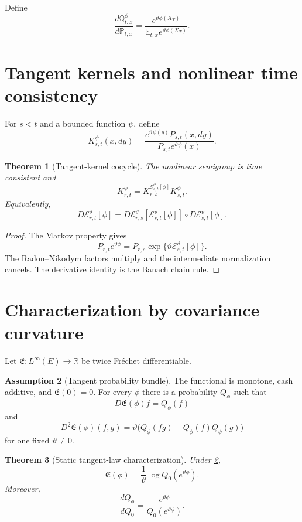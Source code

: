 \documentclass[11pt,reqno]{amsart}
\newtheorem{theorem}{Theorem}[section]
\theoremstyle{definition}
\newtheorem{assumption}[theorem]{Assumption}
\theoremstyle{remark}
\newcommand{\E}{\mathbb E}
\newcommand{\Pp}{\mathbb P}
\newcommand{\Qp}{\mathbb Q}
\newcommand{\R}{\mathbb R}
\newcommand{\cE}{\mathcal E}
\begin{document}
Define
\[
 \frac{d\Qp_{t,x}^{\phi}}{d\Pp_{t,x}}
 =
 \frac{e^{\vartheta\phi(X_T)}}
 {\E_{t,x}e^{\vartheta\phi(X_T)}}.
\]

\section{Tangent kernels and nonlinear time consistency}\label{sec:cocycle}

For $s<t$ and a bounded function $\psi$, define
\[
 K_{s,t}^{\psi}(x,dy)
 =
 \frac{e^{\vartheta\psi(y)}P_{s,t}(x,dy)}
 {P_{s,t}e^{\vartheta\psi}(x)}.
\]

\begin{theorem}[Tangent-kernel cocycle]\label{thm:cocycle}
The nonlinear semigroup is time consistent and
\[
 K_{r,t}^{\phi}
 =
 K_{r,s}^{\cE_{s,t}^{\vartheta}[\phi]}
 K_{s,t}^{\phi}.
\]
Equivalently,
\[
 D\cE_{r,t}^{\vartheta}[\phi]
 =
 D\cE_{r,s}^{\vartheta}
 [\cE_{s,t}^{\vartheta}[\phi]]
 \circ
 D\cE_{s,t}^{\vartheta}[\phi].
\]
\end{theorem}

\begin{proof}
The Markov property gives
\[
 P_{r,t}e^{\vartheta\phi}
 =
 P_{r,s}
 \exp\{\vartheta\cE_{s,t}^{\vartheta}[\phi]\}.
\]
The Radon--Nikodym factors multiply and the intermediate normalization
cancels.  The derivative identity is the Banach chain rule.
\end{proof}

\section{Characterization by covariance curvature}\label{sec:characterization}

Let $\mathfrak E:L^\infty(E)\to\R$ be twice Fr\'echet differentiable.

\begin{assumption}[Tangent probability bundle]\label{ass:curvature}
The functional is monotone, cash additive, and $\mathfrak E(0)=0$.  For every
$\phi$ there is a probability $Q_\phi$ such that
\[
 D\mathfrak E(\phi)f=Q_\phi(f)
\]
and
\[
 D^2\mathfrak E(\phi)(f,g)
 =
 \vartheta\bigl(Q_\phi(fg)-Q_\phi(f)Q_\phi(g)\bigr)
\]
for one fixed $\vartheta\ne0$.
\end{assumption}

\begin{theorem}[Static tangent-law characterization]\label{thm:static-char}
Under \cref{ass:curvature},
\[
 \mathfrak E(\phi)
 =
 \frac1\vartheta
 \log Q_0(e^{\vartheta\phi}).
\]
Moreover,
\[
 \frac{dQ_\phi}{dQ_0}
 =
 \frac{e^{\vartheta\phi}}
 {Q_0(e^{\vartheta\phi})}.
\]
\end{theorem}
\end{document}
